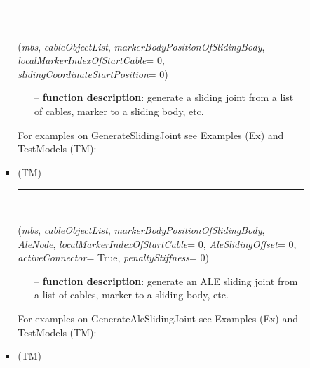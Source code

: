 \begin{itemize}[leftmargin=1.4cm]
\begin{itemize}[leftmargin=1.4cm]
\begin{itemize}[leftmargin=0.5cm]
\begin{itemize}[leftmargin=1.4cm]
%
\noindent\rule{8cm}{0.75pt}\vspace{1pt} \\ 
\begin{flushleft}
\label{sec:beams:GenerateSlidingJoint}
({\it mbs}, {\it cableObjectList}, {\it markerBodyPositionOfSlidingBody}, {\it localMarkerIndexOfStartCable}= 0, {\it slidingCoordinateStartPosition}= 0)
\end{flushleft}
\setlength{\itemindent}{0.7cm}
\begin{itemize}[leftmargin=0.7cm]
  \item[--]  {\bf function description}: generate a sliding joint from a list of cables, marker to a sliding body, etc.\vspace{12pt}\end{itemize}
%
%
\noindent For examples on GenerateSlidingJoint see Examples (Ex) and TestModels (TM):
\bi
 \item \footnotesize {} (TM)\ei

%
\noindent\rule{8cm}{0.75pt}\vspace{1pt} \\ 
\begin{flushleft}
\label{sec:beams:GenerateAleSlidingJoint}
({\it mbs}, {\it cableObjectList}, {\it markerBodyPositionOfSlidingBody}, {\it AleNode}, {\it localMarkerIndexOfStartCable}= 0, {\it AleSlidingOffset}= 0, {\it activeConnector}= True, {\it penaltyStiffness}= 0)
\end{flushleft}
\setlength{\itemindent}{0.7cm}
\begin{itemize}[leftmargin=0.7cm]
  \item[--]  {\bf function description}: generate an ALE sliding joint from a list of cables, marker to a sliding body, etc.\vspace{12pt}\end{itemize}
%
%
\noindent For examples on GenerateAleSlidingJoint see Examples (Ex) and TestModels (TM):
\bi
 \item \footnotesize {} (TM)\ei


\end{itemize}
\end{itemize}
\end{itemize}
\end{itemize}
